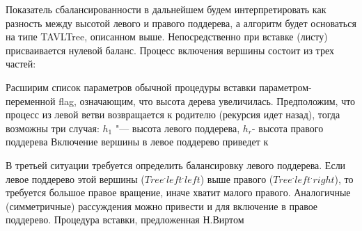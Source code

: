 Показатель сбалансированности в дальнейшем будем интерпретировать
как разность между высотой левого и правого поддерева,
а алгоритм будет основаться на типе TAVLTree, описанном выше.
Непосредственно при вставке (листу) присваивается нулевой баланс.
Процесс включения вершины состоит из трех частей:



Расширим список параметров обычной процедуры вставки параметром-переменной flag,
означающим, что высота дерева увеличилась.
Предположим, что процесс из левой ветви возвращается к родителю (рекурсия идет назад),
тогда возможны три случая:
{$h_1$ "--- высота левого поддерева, $h_r$- высота правого поддерева}
Включение вершины в левое поддерево приведет к



В третьей ситуации требуется определить балансировку левого поддерева.
Если левое поддерево этой вершины ($Tree^.left^.left$) выше правого ($Tree^.left^.right$),
то требуется большое правое вращение, иначе хватит малого правого.
Аналогичные (симметричные) рассуждения можно привести и для включение в правое поддерево.
Процедура вставки, предложенная Н.Виртом

